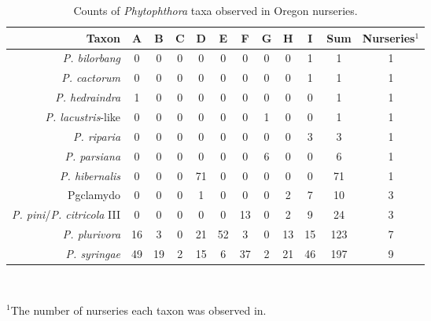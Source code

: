 \documentclass[12pt]{article}
\begin{document}
\begin{table}[ht]
\centering
\caption{Counts of \emph{Phytophthora} taxa observed in Oregon nurseries.} 
\label{tab:taxa_counts}
\begin{tabular}{rccccccccccc}
  \hline
 \textbf{Taxon} & \textbf{A} & \textbf{B} & \textbf{C} & \textbf{D} & \textbf{E} & \textbf{F} & \textbf{G} & \textbf{H} & \textbf{I} & \textbf{Sum} & \textbf{Nurseries}$^{1}$ \\ 
  \hline
  \emph{P. bilorbang} & 0 & 0 & 0 & 0 & 0 & 0 & 0 & 0 & 1 & 1 & 1 \\ 
  \emph{P. cactorum} & 0 & 0 & 0 & 0 & 0 & 0 & 0 & 0 & 1 & 1 & 1 \\ 
  \emph{P. hedraindra}  & 1 & 0 & 0 & 0 & 0 & 0 & 0 & 0 & 0 & 1 & 1 \\ 
  \emph{P. lacustris}-like & 0 & 0 & 0 & 0 & 0 & 0 & 1 & 0 & 0 & 1 & 1 \\ 
  \emph{P. riparia} & 0 & 0 & 0 & 0 & 0 & 0 & 0 & 0 & 3 & 3 & 1 \\ 
  \emph{P. parsiana} & 0 & 0 & 0 & 0 & 0 & 0 & 6 & 0 & 0 & 6 & 1 \\ 
  \emph{P. hibernalis} & 0 & 0 & 0 & 71 & 0 & 0 & 0 & 0 & 0 & 71 & 1 \\ 
  Pgclamydo & 0 & 0 & 0 & 1 & 0 & 0 & 0 & 2 & 7 & 10 & 3 \\ 
  \emph{P. pini}/\emph{P. citricola} III & 0 & 0 & 0 & 0 & 0 & 13 & 0 & 2 & 9 & 24 & 3 \\ 
  \emph{P. plurivora} & 16 & 3 & 0 & 21 & 52 & 3 & 0 & 13 & 15 & 123 & 7 \\ 
  \emph{P. syringae} & 49 & 19 & 2 & 15 & 6 & 37 & 2 & 21 & 46 & 197 & 9 \\ 
   \hline
\end{tabular}
\\
\vspace{12pt}
\raggedright
$^{1}$The number of nurseries each taxon was observed in.
\end{table}
\end{document}
